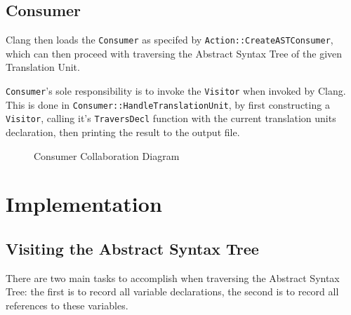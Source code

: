 \subsection{Consumer}
Clang then loads the \lstinline|Consumer| as specifed by
\lstinline|Action::CreateASTConsumer|, which can then proceed with traversing
the Abstract Syntax Tree of the given Translation Unit.

\lstinline|Consumer|'s sole responsibility is to invoke the \lstinline|Visitor|
when invoked by Clang. This is done in
\lstinline|Consumer::HandleTranslationUnit|, by first constructing a
\lstinline|Visitor|, calling it's \lstinline|TraversDecl| function with the
current translation units declaration, then printing the result to the output
file.

\begin{figure}[h]
	\label{fig:Consumer}
	\caption{Consumer Collaboration Diagram}
	\centering
\end{figure}

\section{Implementation}
\subsection{Visiting the Abstract Syntax Tree}
\label{subsec:visitation}

There are two main tasks to accomplish when traversing the Abstract Syntax Tree:
the first is to record all variable declarations, the second is to record all
references to these variables.

